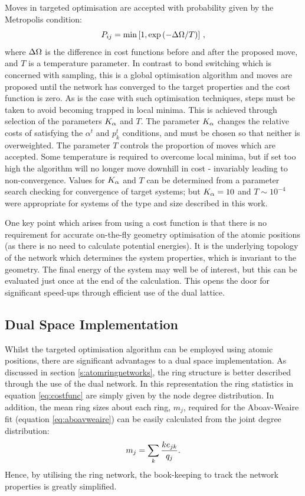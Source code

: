 Moves in targeted optimisation are accepted with probability given by the Metropolis condition:
\begin{equation}
	P_{ij}=\min\left[1,\exp{\left(-\Delta\Omega/T\right)}\right]\,,
\end{equation}
where $\Delta\Omega$ is the difference in cost functions before and after the proposed move, and $T$ is a temperature parameter. 
In contrast to bond switching which is concerned with sampling, this is a global optimisation algorithm and moves are proposed until the network has converged to the target properties and the cost function is zero.
As is the case with such optimisation techniques, steps must be taken to avoid becoming trapped in local minima. %
This is achieved through selection of the parameters $K_\alpha$ and $T$. 
The parameter $K_\alpha$ changes the relative costs of satisfying the $\alpha^t$ and $p_k^t$ conditions, and must be chosen so that neither is overweighted. The parameter $T$ controls the proportion of moves which are accepted. 
Some temperature is required to overcome local minima, but if set too high the algorithm will no longer move downhill in cost %
\-- invariably leading to non\--convergence. 
Values for $K_\alpha$ and $T$ can be determined from a parameter search checking for convergence of target systems; but $K_\alpha=10$ and $T\sim 10^{-4}$ were appropriate for systems of the type and size described in this work. 

One key point which arises from using a cost function is that there is no requirement for accurate on\--the\--fly geometry optimisation of the atomic positions (as there is no need to calculate potential energies).
It is the underlying topology of the network which determines the system properties, which is invariant to the geometry.
The final energy of the system may well be of interest, but this can be evaluated just once at the end of the calculation.
This opens the door for significant speed\--ups through efficient use of the dual lattice.

\subsection{Dual Space Implementation}

Whilst the targeted optimisation algorithm can be employed using atomic positions, there are significant advantages to a dual space implementation.
As discussed in section \ref{s:atomringnetworks}, the ring structure is better described through the use of the dual network. 
In this representation the ring statistics in equation \eqref{eq:costfunc} are simply given by the node degree distribution. 
In addition, the mean ring sizes about each ring, $m_j$, required for the Aboav\--Weaire fit (equation \eqref{eq:aboavweaire}) can be easily calculated from the joint degree distribution:
\begin{equation}
	\label{eq:mjejklink}
	m_j = \sum\limits_k \frac{ke_{jk}}{q_j}.
\end{equation}
Hence, by utilising the ring network, the book\--keeping to track the network properties is greatly simplified.

